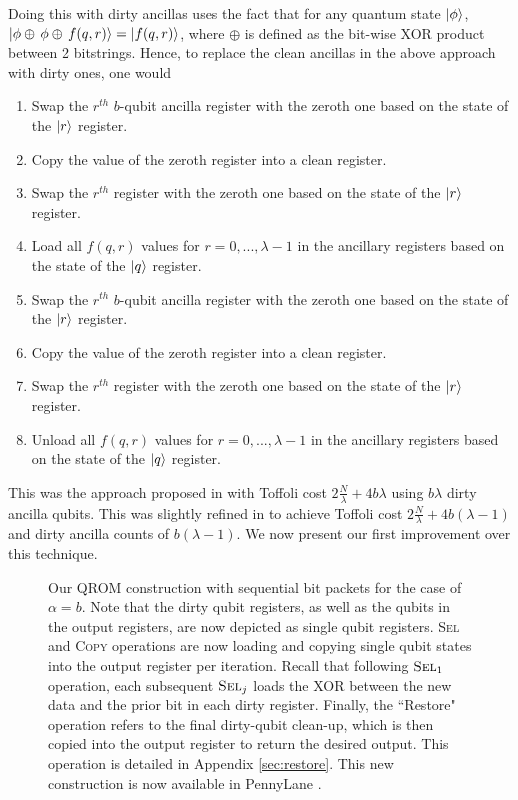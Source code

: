\documentclass[a4paper, amsfonts, amssymb, amsmath, reprint, showkeys, twoside,superscriptaddress, onecolumn, nofootinbib]{revtex4-2}
\begin{document}
Doing this with dirty ancillas uses the fact that for any quantum state $\ket{\phi}$, $\ket{\phi \oplus \, \phi \oplus \,f(q,r)} = \ket{f(q,r)}$, where $\oplus$ is defined as the bit-wise XOR product between 2 bitstrings. Hence, to replace the clean ancillas in the above approach with dirty ones, one would
\begin{enumerate}
    \item Swap the $r^{th}$ $b$-qubit ancilla register with the zeroth one based on the state of the $\ket{r}$ register.
    \item Copy the value of the zeroth register into a clean register.
    \item Swap the $r^{th}$ register with the zeroth one based on the state of the $\ket{r}$ register.
    \item Load all $f(q,r)$ values for $r=0,...,\lambda -1$ in the ancillary registers based on the state of the $\ket{q}$ register.
    \item Swap the $r^{th}$ $b$-qubit ancilla register with the zeroth one based on the state of the $\ket{r}$ register.
    \item Copy the value of the zeroth register into a clean register.
    \item Swap the $r^{th}$ register with the zeroth one based on the state of the $\ket{r}$ register.
    \item Unload all $f(q,r)$ values for $r=0,...,\lambda -1$ in the ancillary registers based on the state of the $\ket{q}$ register.
\end{enumerate}
This was the approach proposed in \cite{low2024trading} with Toffoli cost $2\frac{N}{\lambda} + 4b\lambda$ using $b\lambda$ dirty ancilla qubits. This was slightly refined in \cite{berry2019qubitization} to achieve Toffoli cost $2\frac{N}{\lambda} + 4b(\lambda - 1)$ and dirty ancilla counts of $b(\lambda-1)$. We now present our first improvement over this technique.

\begin{figure}[t!]
    \centering
    \caption{Our QROM construction with sequential bit packets for the case of $\alpha = b$. Note that the dirty qubit registers, as well as the qubits in the output registers, are now depicted as single qubit registers. \textsc{Sel} and \textsc{Copy} operations are now loading and copying single qubit states into the output register per iteration. Recall that following $\textsc{Sel}_1$ operation, each subsequent $\textsc{Sel}_j$ loads the XOR between the new data and the prior bit in each dirty register. Finally, the ``Restore" operation refers to the final dirty-qubit clean-up, which is then copied into the output register to return the desired output. This operation is detailed in Appendix \ref{sec:restore}. This new construction is now available in PennyLane \cite{bergholm2018pennylane}.}
    \label{fig:one_bit_qrom}
\end{figure}
\end{document}

